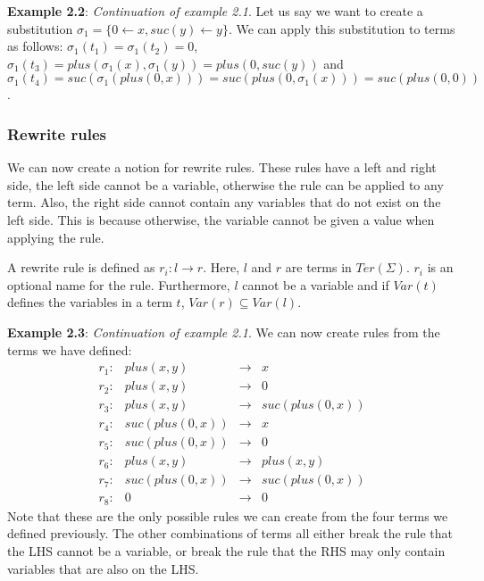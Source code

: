 \textbf{Example 2.2}: \textit{Continuation of example 2.1}. Let us say we want to create a substitution $\sigma_1 = \{ 0 \leftarrow x, suc(y) \leftarrow y \}$. We can apply this substitution to terms as follows: $\sigma_1(t_1) = \sigma_1(t_2) = 0$, $\sigma_1(t_3) = plus(\sigma_1(x), \sigma_1(y)) = plus(0, suc(y))$ and $\sigma_1(t_4) = suc(\sigma_1(plus(0, x))) = suc(plus(0, \sigma_1(x))) = suc(plus(0, 0))$.

\subsubsection*{Rewrite rules}
We can now create a notion for rewrite rules. These rules have a left and right side, the left side cannot be a variable, otherwise the rule can be applied to any term. Also, the right side cannot contain any variables that do not exist on the left side. This is because otherwise, the variable cannot be given a value when applying the rule.
\begin{definition}
A rewrite rule is defined as $r_i : l \rightarrow r$. Here, $l$ and $r$ are terms in $\textit{Ter}(\Sigma)$. $r_i$ is an optional name for the rule. Furthermore, $l$ cannot be a variable and if $\textit{Var}(t)$ defines the variables in a term $t$, $\textit{Var}(r) \subseteq \textit{Var}(l)$. 
\end{definition}

\textbf{Example 2.3}: \textit{Continuation of example 2.1}. We can now create rules from the terms we have defined:\newline
$$
\begin{array}{lrcl}
    r_1: & plus(x, y) & \rightarrow & x \\
    r_2: & plus(x, y) & \rightarrow & 0 \\
    r_3: & plus(x, y) & \rightarrow & suc(plus(0, x))\\
    r_4: & suc(plus(0, x)) & \rightarrow & x\\
    r_5: & suc(plus(0, x)) & \rightarrow & 0\\
    r_6: & plus(x, y) & \rightarrow & plus(x, y) \\
    r_7: & suc(plus(0, x)) & \rightarrow & suc(plus(0, x))\\
    r_8: & 0 & \rightarrow & 0
\end{array}
$$
Note that these are the only possible rules we can create from the four terms we defined previously. The other combinations of terms all either break the rule that the LHS cannot be a variable, or break the rule that the RHS may only contain variables that are also on the LHS.

